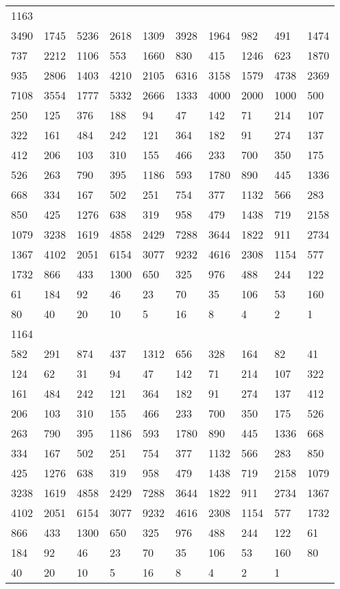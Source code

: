 \begin{longtable}{*{10}{l}}
1163&&&&&&&&&\\
3490& 1745& 5236& 2618& 1309& 3928& 1964& 982& 491& 1474\\
737& 2212& 1106& 553& 1660& 830& 415& 1246& 623& 1870\\
935& 2806& 1403& 4210& 2105& 6316& 3158& 1579& 4738& 2369\\
7108& 3554& 1777& 5332& 2666& 1333& 4000& 2000& 1000& 500\\
250& 125& 376& 188& 94& 47& 142& 71& 214& 107\\
322& 161& 484& 242& 121& 364& 182& 91& 274& 137\\
412& 206& 103& 310& 155& 466& 233& 700& 350& 175\\
526& 263& 790& 395& 1186& 593& 1780& 890& 445& 1336\\
668& 334& 167& 502& 251& 754& 377& 1132& 566& 283\\
850& 425& 1276& 638& 319& 958& 479& 1438& 719& 2158\\
1079& 3238& 1619& 4858& 2429& 7288& 3644& 1822& 911& 2734\\
1367& 4102& 2051& 6154& 3077& 9232& 4616& 2308& 1154& 577\\
1732& 866& 433& 1300& 650& 325& 976& 488& 244& 122\\
61& 184& 92& 46& 23& 70& 35& 106& 53& 160\\
80& 40& 20& 10& 5& 16& 8& 4& 2& 1\\

1164&&&&&&&&&\\
582& 291& 874& 437& 1312& 656& 328& 164& 82& 41\\
124& 62& 31& 94& 47& 142& 71& 214& 107& 322\\
161& 484& 242& 121& 364& 182& 91& 274& 137& 412\\
206& 103& 310& 155& 466& 233& 700& 350& 175& 526\\
263& 790& 395& 1186& 593& 1780& 890& 445& 1336& 668\\
334& 167& 502& 251& 754& 377& 1132& 566& 283& 850\\
425& 1276& 638& 319& 958& 479& 1438& 719& 2158& 1079\\
3238& 1619& 4858& 2429& 7288& 3644& 1822& 911& 2734& 1367\\
4102& 2051& 6154& 3077& 9232& 4616& 2308& 1154& 577& 1732\\
866& 433& 1300& 650& 325& 976& 488& 244& 122& 61\\
184& 92& 46& 23& 70& 35& 106& 53& 160& 80\\
40& 20& 10& 5& 16& 8& 4& 2& 1& \\


\end{longtable}
